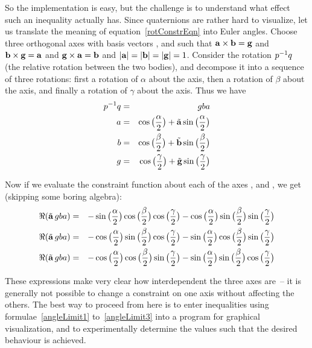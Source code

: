 So the implementation is easy, but the challenge is to understand what effect such an inequality
actually has. Since quaternions are rather hard to visualize, let us translate the meaning of
equation~\ref{rotConstrEqn} into Euler angles. Choose three orthogonal axes with basis vectors
,  and  such that $\ve{a}\times\ve{b}=\ve{g}$ and $\ve{b}\times\ve{g}=\ve{a}$
and $\ve{g}\times\ve{a}=\ve{b}$ and $\norm{\ve{a}} = \norm{\ve{b}} = \norm{\ve{g}} = 1$.
Consider the rotation $p^{-1}q$ (the relative rotation between the two bodies), and
decompose it into a sequence of three rotations: first a rotation of $\alpha$ about the 
axis, then a rotation of $\beta$ about the  axis, and finally a rotation of $\gamma$ about
the  axis. Thus we have
\begin{eqnarray}
\q{p}^{-1}\q{q} &=& \q{g}\q{b}\q{a} \\
\q{a} &=& \cos\big(\frac{\alpha}{2}\big) + \tilde{\ve{a}}\sin\big(\frac{\alpha}{2}\big) \\
\q{b} &=& \cos\big(\frac{\beta }{2}\big) + \tilde{\ve{b}}\sin\big(\frac{\beta }{2}\big) \\
\q{g} &=& \cos\big(\frac{\gamma}{2}\big) + \tilde{\ve{g}}\sin\big(\frac{\gamma}{2}\big)
\end{eqnarray}

Now if we evaluate the constraint function about each of the axes ,  and , we
get (skipping some boring algebra):
\begin{eqnarray}
\Re(\tilde{\ve{a}}\,\q{g}\q{b}\q{a}) &=& -\sin\big(\frac{\alpha}{2}\big)
     \cos\big(\frac{\beta }{2}\big)   \cos\big(\frac{\gamma}{2}\big)
    -\cos\big(\frac{\alpha}{2}\big)   \sin\big(\frac{\beta }{2}\big)
     \sin\big(\frac{\gamma}{2}\big)   \label{angleLimit1}\\
\Re(\tilde{\ve{a}}\,\q{g}\q{b}\q{a}) &=& -\cos\big(\frac{\alpha}{2}\big)
     \sin\big(\frac{\beta }{2}\big)   \cos\big(\frac{\gamma}{2}\big)
    -\sin\big(\frac{\alpha}{2}\big)   \cos\big(\frac{\beta }{2}\big)
     \sin\big(\frac{\gamma}{2}\big)   \label{angleLimit2}\\
\Re(\tilde{\ve{a}}\,\q{g}\q{b}\q{a}) &=& -\cos\big(\frac{\alpha}{2}\big)
     \cos\big(\frac{\beta }{2}\big)   \sin\big(\frac{\gamma}{2}\big)
    -\sin\big(\frac{\alpha}{2}\big)   \sin\big(\frac{\beta }{2}\big)
     \cos\big(\frac{\gamma}{2}\big)   \label{angleLimit3}
\end{eqnarray}

These expressions make very clear how interdependent the three axes are~-- it is generally not
possible to change a constraint on one axis without affecting the others. The best way to proceed
from here is to enter inequalities using formulae~\ref{angleLimit1} to~\ref{angleLimit3} into
a program for graphical visualization, and to experimentally determine the values such that the
desired behaviour is achieved.


